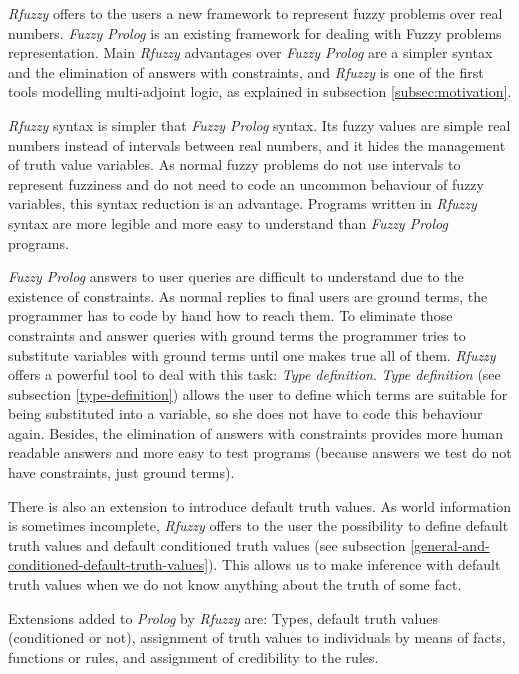 \documentclass[runningheads,a4paper]{llncs}
\begin{document}
{\it Rfuzzy} offers to the users a new framework to represent 
fuzzy problems over real numbers. 
{\it Fuzzy Prolog} 
\cite{Vaucheret_ICLP02,Vaucheret_LPAR02,Susana_FSS04}
is an existing framework for dealing with Fuzzy problems
representation.  
Main {\it Rfuzzy} advantages over {\it Fuzzy Prolog} are 
a simpler syntax and the elimination of answers with constraints,
and {\it Rfuzzy} is one of the first tools modelling 
multi-adjoint logic, as explained in subsection 
\ref{subsec:motivation}.

{\it Rfuzzy} syntax is simpler that {\it Fuzzy Prolog} syntax.
Its fuzzy values are simple real numbers instead of 
intervals between real numbers, and it hides the
management of truth value variables.
As normal fuzzy problems do not use intervals to represent 
fuzziness and do not need to code an uncommon behaviour of 
fuzzy variables, this syntax reduction is an advantage. 
Programs written in {\it Rfuzzy} syntax are more legible
and more easy to understand than {\it Fuzzy Prolog} programs.

{\it Fuzzy Prolog} answers to user queries are difficult to 
understand due to the existence of constraints. 
As normal replies to final users are ground terms, 
the programmer has to code by hand how to reach them.
To eliminate those constraints and answer queries with 
ground terms the programmer tries to substitute variables 
with ground terms until one makes true all of them.
{\it Rfuzzy} offers a powerful tool to deal with this 
task: {\it Type definition}. 
{\it Type definition} (see subsection \ref{type-definition})
allows the user to define which terms are suitable for 
being substituted into a variable, so she does not have to 
code this behaviour again. 
Besides, the elimination of answers with constraints provides 
more human readable answers and more easy to test programs
(because answers we test do not have constraints, 
just ground terms). 

There is also an extension to introduce default truth values. 
As world information is sometimes incomplete, {\it Rfuzzy}
offers to the user the possibility to define default truth 
values and default conditioned truth values (see subsection 
\ref{general-and-conditioned-default-truth-values}).
This allows us to make inference with default truth values
when we do not know anything about the truth of some fact.

Extensions added to {\it Prolog} by {\it Rfuzzy} are:
Types, default truth values (conditioned or not),
assignment of truth values to individuals by means of facts, 
functions or rules, 
and assignment of credibility to the rules.
\end{document}
